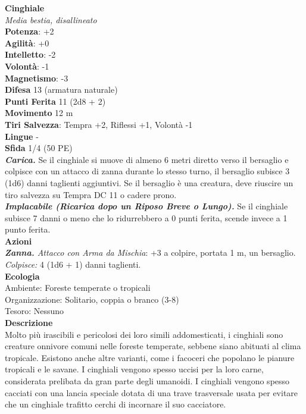 \begin{multicols}{2}
\medskip\textbf{Cinghiale}\\
\emph{Media bestia, disallineato}\\
\textbf{Potenza}: +2\\
\textbf{Agilità}: +0\\
\textbf{Intelletto}: -2\\
\textbf{Volontà}: -1\\
\textbf{Magnetismo}: -3\\
\textbf{Difesa} 13 (armatura naturale)\\
\textbf{Punti Ferita} 11 (2d8 + 2)\\
\textbf{Movimento} 12 m\\
\textbf{Tiri Salvezza}: Tempra +2, Riflessi +1, Volontà -1 \\
\textbf{Lingue} -\\
\textbf{Sfida} 1/4 (50 PE)\smallskip\\
\emph{\textbf{Carica.}} Se il cinghiale si muove di almeno 6 metri diretto verso il bersaglio e colpisce con un attacco di zanna durante lo stesso turno, il bersaglio subisce 3 (1d6) danni taglienti aggiuntivi. Se il bersaglio è una creatura, deve riuscire un tiro salvezza su Tempra DC 11 o cadere prono.\\
\emph{\textbf{Implacabile (Ricarica dopo un Riposo Breve o Lungo).}} Se il cinghiale subisce 7 danni o meno che lo ridurrebbero a 0 punti ferita, scende invece a 1 punto ferita.\\
\smallskip\textbf{Azioni}\\
\emph{\textbf{Zanna.} Attacco con Arma da Mischia}: +3 a colpire, portata 1 m, un bersaglio.\\
\emph{Colpisce:} 4 (1d6 + 1) danni taglienti. \\
\textbf{Ecologia}\\
Ambiente: Foreste temperate o tropicali\\
Organizzazione: Solitario, coppia o branco (3-8)\\
Tesoro: Nessuno\\
\textbf{Descrizione}\\

Molto più irascibili e pericolosi dei loro simili addomesticati, i cinghiali sono creature onnivore comuni nelle foreste temperate, sebbene siano abituati al clima tropicale. Esistono anche altre varianti, come i facoceri che popolano le pianure tropicali e le savane. I cinghiali vengono spesso uccisi per la loro carne, considerata prelibata da gran parte degli umanoidi. I cinghiali vengono spesso cacciati con una lancia speciale dotata di una trave trasversale usata per evitare che un cinghiale trafitto cerchi di incornare il suo cacciatore.\\


\end{multicols}
